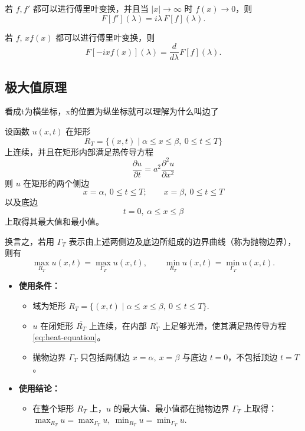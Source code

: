 \begin{theorem}\label{thm:FT-derivative}
若 $f,f'$ 都可以进行傅里叶变换，并且当 $|x|\to\infty$ 时 $f(x)\to0$，则
\[
  F[f'](\lambda)=i\lambda\,F[f](\lambda).
\]
\end{theorem}

\begin{theorem}\label{thm:FT-x-times}
若 $f,\,xf(x)$ 都可以进行傅里叶变换，则
\[
  F[-ix f(x)](\lambda)=\frac{d}{d\lambda}F[f](\lambda).
\]
\end{theorem}
\subsection{极大值原理}
\begin{dxtips}
    看成t为横坐标，x的位置为纵坐标就可以理解为什么叫边了
    
\end{dxtips}
\begin{theorem}[极值原理]\label{thm:max-principle}
设函数 $u(x,t)$ 在矩形
\[
R_T=\{(x,t)\mid \alpha \le x \le \beta,\ 0\le t\le T\}
\]
上连续，并且在矩形内部满足热传导方程
\begin{equation}\label{eq:heat-equation}
  \frac{\partial u}{\partial t}
  = a^{2}\frac{\partial^{2}u}{\partial x^{2}}
  \tag{4.1}
\end{equation}
则 $u$ 在矩形的两个侧边
\[
x=\alpha,\ 0\le t\le T;\qquad x=\beta,\ 0\le t\le T
\]
以及底边
\[
t=0,\ \alpha\le x\le\beta
\]
上取得其最大值和最小值。

换言之，若用 $\Gamma_T$ 表示由上述两侧边及底边所组成的边界曲线（称为抛物边界），则有
\[
\max_{R_T} u(x,t)=\max_{\Gamma_T} u(x,t),\qquad
\min_{R_T} u(x,t)=\min_{\Gamma_T} u(x,t).
\]
\end{theorem}
\begin{itemize}
  \item \textbf{使用条件：}
    \begin{itemize}
      \item 域为矩形 
      \(
      R_T=\{(x,t)\mid \alpha \le x \le \beta,\ 0\le t\le T\}.
      \)
      \item $u$ 在闭矩形 $\overline{R_T}$ 上连续，在内部 $R_T^\circ$ 上足够光滑，使其满足热传导方程 \eqref{eq:heat-equation}。
      \item 抛物边界 $\Gamma_T$ 只包括两侧边 \(x=\alpha,\ x=\beta\) 与底边 \(t=0\)，不包括顶边 \(t=T\)。
    \end{itemize}
  \item \textbf{使用结论：}
    \begin{itemize}
      \item 在整个矩形 $R_T$ 上，$u$ 的最大值、最小值都在抛物边界 $\Gamma_T$ 上取得：
      \(
      \max_{R_T} u = \max_{\Gamma_T} u,\ 
      \min_{R_T} u = \min_{\Gamma_T} u.
      \)
    \end{itemize}
\end{itemize}
